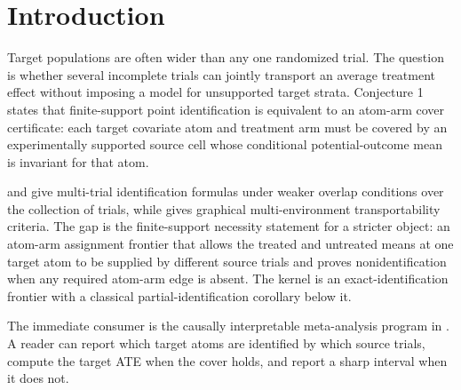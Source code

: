 \documentclass[11pt]{article}
\theoremstyle{definition}
\theoremstyle{plain}
\theoremstyle{remark}
\begin{document}
\section{Introduction}
Target populations are often wider than any one randomized trial. The question is whether several incomplete trials can jointly transport an average treatment effect without imposing a model for unsupported target strata. Conjecture 1 states that finite-support point identification is equivalent to an atom-arm cover certificate: each target covariate atom and treatment arm must be covered by an experimentally supported source cell whose conditional potential-outcome mean is invariant for that atom.

\citet[Sec. 2.4]{DahabrehPetitoRobertsonHernanSteingrimsson2020} and \citet[Sec. 3.4, Theorem 3]{DahabrehRobertsonPetitoHernanSteingrimsson2023} give multi-trial identification formulas under weaker overlap conditions over the collection of trials, while \citet[Sec. 3]{BareinboimLeeHonavarPearl2013} gives graphical multi-environment transportability criteria. The gap is the finite-support necessity statement for a stricter object: an atom-arm assignment frontier that allows the treated and untreated means at one target atom to be supplied by different source trials and proves nonidentification when any required atom-arm edge is absent. The kernel is an exact-identification frontier with a classical partial-identification corollary below it.

The immediate consumer is the causally interpretable meta-analysis program in \citet{DahabrehRobertsonPetitoHernanSteingrimsson2023}. A reader can report which target atoms are identified by which source trials, compute the target ATE when the cover holds, and report a sharp interval when it does not.
\end{document}
